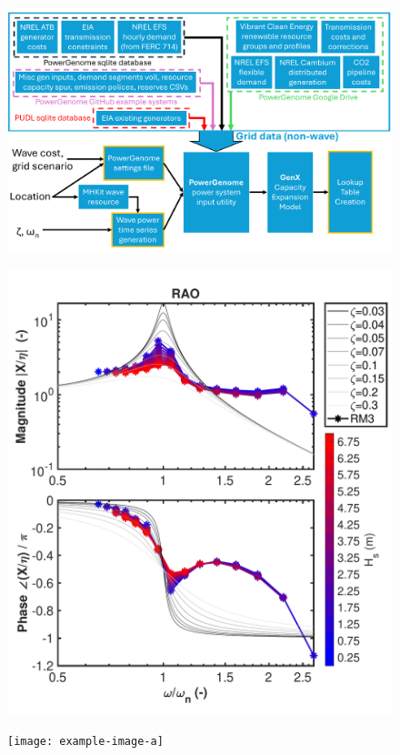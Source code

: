 \documentclass[10pt,twoside]{article}
\begin{document}
\begin{figure}[b]
\noindent
\begin{minipage}[t]{0.32\textwidth}
    \centering
    \includegraphics[width=\linewidth]{figures/PowerGenomeDataFlow_no_beta.pdf}
    \label{fig:CEM-data-flow}
\end{minipage}
\hfill
\begin{minipage}[t]{0.32\textwidth}
    \centering
    \includegraphics[width=\linewidth]{figures/bode_second_order.pdf}
    \label{fig:bode}
\end{minipage}
\hfill
\begin{minipage}[t]{0.32\textwidth}
    \centering
    \texttt{[image: example-image-a]}
    \label{fig:three}
\end{minipage}
\end{figure}
\end{document}
